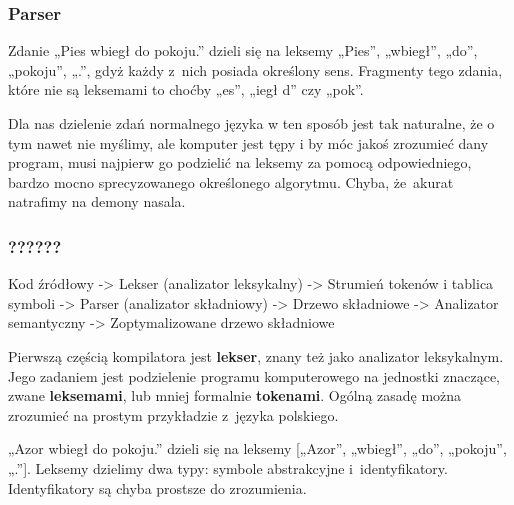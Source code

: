 \documentclass[10pt,t]{beamer}
\begin{document}
\begin{frame}
  \frametitle{Parser}


  Zdanie „Pies wbiegł do pokoju.” dzieli się na leksemy „Pies”, „wbiegł”,
  „do”, „pokoju”, „.”, gdyż każdy z~nich posiada określony sens. Fragmenty
  tego zdania, które nie są leksemami to choćby „es”, „iegł d” czy „pok”.

  Dla nas dzielenie zdań normalnego języka w ten sposób jest tak naturalne,
  że o tym nawet nie myślimy, ale komputer jest tępy i by móc jakoś
  zrozumieć dany program, musi najpierw go podzielić na leksemy za pomocą
  odpowiedniego, bardzo mocno sprecyzowanego określonego algorytmu.
  Chyba, że~akurat natrafimy na
  {demony nasala}.

\end{frame}











\begin{frame}
  \frametitle{??????}


  Kod źródłowy -> Lekser (analizator leksykalny) -> Strumień tokenów i
  tablica symboli -> Parser (analizator składniowy) -> Drzewo
  składniowe -> Analizator semantyczny -> Zoptymalizowane drzewo składniowe

  Pierwszą częścią kompilatora jest \textbf{lekser}, znany też jako
  analizator leksykalnym. Jego zadaniem jest podzielenie programu
  komputerowego na jednostki znaczące, zwane \textbf{leksemami}, lub
  mniej formalnie \textbf{tokenami}. Ogólną zasadę można zrozumieć na
  prostym przykładzie z~języka polskiego.

  „Azor wbiegł do pokoju.” dzieli się na leksemy [„Azor”, „wbiegł”, „do”,
  „pokoju”, „.”]. Leksemy dzielimy dwa typy: symbole abstrakcyjne
  i~identyfikatory. Identyfikatory są chyba prostsze do zrozumienia.

\end{frame}
\end{document}
